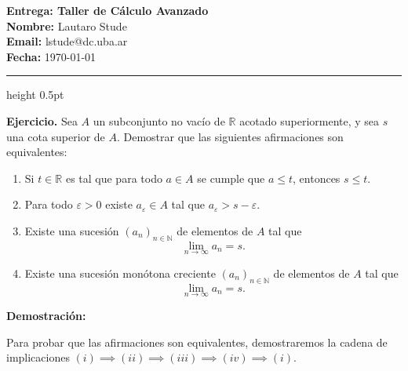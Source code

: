 \documentclass[11pt, a4paper]{article}
\newcommand{\R}{\mathbb{R}}
\newcommand{\N}{\mathbb{N}}
\newcommand{\eps}{\varepsilon}
\begin{document}
	
	\begin{center}
		{\LARGE \textbf{Entrega: Taller de Cálculo Avanzado}} \\[0.3cm]
		{\large \textbf{Nombre:} Lautaro Stude} \\[0.15cm]
		{\large \textbf{Email:} lstude@dc.uba.ar} \\[0.15cm]
		{\large \textbf{Fecha:} \today} \\[0.4cm]
		\hrule height 0.5pt %
	\end{center}
	
	\vspace{0.6cm}
	
	\noindent\textbf{Ejercicio.} Sea $A$ un subconjunto no vacío de $\R$ acotado superiormente, y sea $s$ una cota superior de $A$. Demostrar que las siguientes afirmaciones son equivalentes:
	
	\begin{enumerate}[label=(\roman*), font=\normalfont, leftmargin=*, itemsep=0.5em]
		\item Si $t \in \R$ es tal que para todo $a \in A$ se cumple que $a \leq t$, entonces $s \leq t$.
		
		\item Para todo $\eps > 0$ existe $a_\eps \in A$ tal que $a_\eps > s - \eps$.
		
		\item Existe una sucesión $(a_n)_{n \in \N}$ de elementos de $A$ tal que 
		\[
		\lim_{n \to \infty} a_n = s.
		\]
		
		\item Existe una sucesión monótona creciente $(a_n)_{n \in \N}$ de elementos de $A$ tal que 
		\[
		\lim_{n \to \infty} a_n = s.
		\]
	\end{enumerate}
	
	\vspace{0.8cm}
	\noindent\textbf{\Large Demostración:}
	
	\vspace{0.4cm}
	Para probar que las afirmaciones son equivalentes, demostraremos la cadena de implicaciones $(i) \implies (ii) \implies (iii) \implies (iv) \implies (i)$.
	
	\vspace{0.4cm}
	
\end{document}
